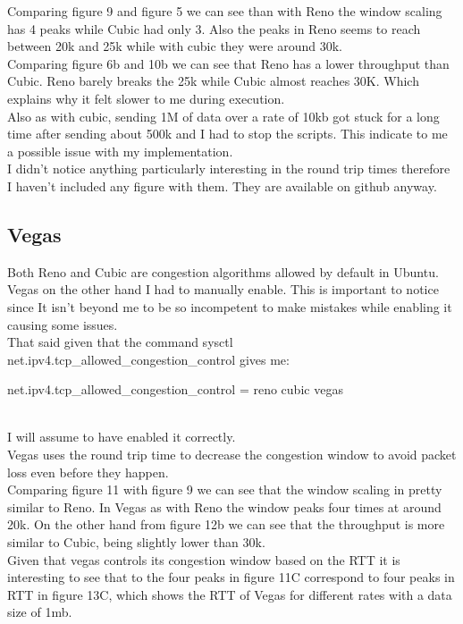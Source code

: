\documentclass{report}
\begin{document}
Comparing figure 9 and figure 5 we can see than with Reno the window scaling has 4 peaks while Cubic had only 3. Also the peaks in Reno seems to reach between 20k and 25k while with cubic they were around 30k.\\
Comparing figure 6b and 10b we can see that Reno has a lower throughput than Cubic. Reno barely breaks the 25k while Cubic almost reaches 30K. Which explains why it felt slower to me during execution.\\
Also as with cubic, sending 1M of data over a rate of 10kb got stuck for a long time after sending about 500k and I had to stop the scripts. This indicate to me a possible issue with my implementation.\\
I didn't notice anything particularly interesting in the round trip times therefore I haven't included any figure with them. They are available on github anyway.

\subsection*{Vegas}
Both Reno and Cubic are congestion algorithms allowed by default in Ubuntu. Vegas on the other hand I had to manually enable. This is important to notice since It isn't beyond me to be so incompetent to make mistakes while enabling it causing some issues.\\
That said given that the command  sysctl net.ipv4.tcp\_allowed\_congestion\_control gives me:\\
\begin{centering}
net.ipv4.tcp\_allowed\_congestion\_control = reno cubic vegas
\end{centering}\\
I will assume to have enabled it correctly.\\
Vegas uses the round trip time to decrease the congestion window to avoid packet loss even before they happen.\\
Comparing figure 11 with figure 9 we can see that the window scaling in pretty similar to Reno. In Vegas as with Reno the window peaks four times at around 20k. On the other hand from figure 12b we can see that the throughput is more similar to Cubic, being slightly lower than 30k.\\
Given that vegas controls its congestion window based on the RTT it is interesting to see that to the four peaks in figure 11C correspond to four peaks in RTT in figure 13C, which shows the RTT of Vegas for different rates with a data size of 1mb. 
\end{document}
